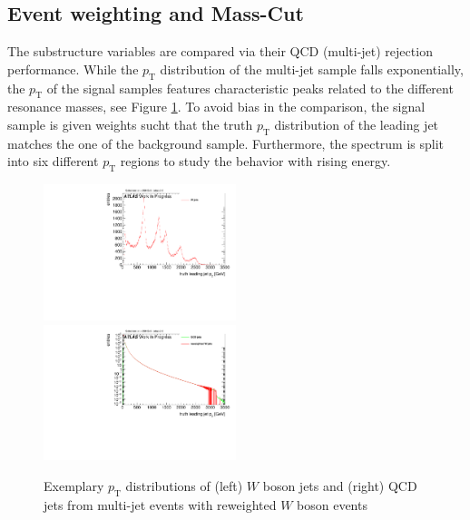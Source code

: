 \subsection{Event weighting and Mass-Cut}
The substructure variables are compared via their QCD (multi-jet) rejection performance. While the $p_{\mathrm{T}}$ distribution of the multi-jet sample falls exponentially, the $p_{\mathrm{T}}$ of the signal samples features characteristic peaks related to the different resonance masses, see Figure \ref{fig:p_T}. To avoid bias in the comparison, the signal sample is given weights sucht that the truth $p_{\mathrm{T}}$ distribution of the leading jet matches the one of the background sample. Furthermore, the spectrum is split into six different $p_{\mathrm{T}}$ regions to study the behavior with rising energy. 
\begin{figure} 
	\includegraphics[width=0.5\textwidth]{sascha_input/plots/track_selection/h_leadpt_truth.pdf} \hspace{1mm}
	\includegraphics[width=0.5\textwidth]{sascha_input/plots/track_selection/h_leadpt_truth_weight.pdf}
\caption{\footnotesize{Exemplary $p_{\mathrm{T}}$ distributions of (left) $W$ boson jets and (right) QCD jets from multi-jet events with reweighted $W$ boson events}}\label{fig:p_T}
\end{figure}

